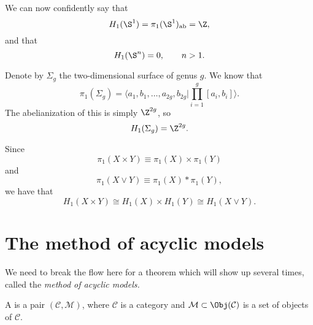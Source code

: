 \documentclass[main.tex]{subfiles}
\begin{document}
\begin{example}
  We can now confidently say that
  \begin{equation*}
    H_{1}(\S^{1}) = \pi_{1}(\S^{1})_{\mathrm{ab}} = \Z,
  \end{equation*}
  and that
  \begin{equation*}
    H_{1}(\S^{n}) = 0,\qquad n > 1.
  \end{equation*}
\end{example}

\begin{example}
  Denote by $\Sigma_{g}$ the two-dimensional surface of genus $g$. We know that
  \begin{equation*}
    \pi_{1}(\Sigma_{g}) = \langle a_{1}, b_{1}, \ldots, a_{2g}, b_{2g} | \prod_{i = 1}^{g} [a_{i}, b_{i}] \rangle.
  \end{equation*}
  The abelianization of this is simply $\Z^{2g}$, so
  \begin{equation*}
    H_{1}(\Sigma_{g}) = \Z^{2g}.
  \end{equation*}
\end{example}

\begin{example}
  Since
  \begin{equation*}
    \pi_{1}(X \times Y) \equiv \pi_{1}(X) \times \pi_{1}(Y)
  \end{equation*}
  and
  \begin{equation*}
    \pi_{1}(X \vee Y) \equiv \pi_{1}(X) * \pi_{1}(Y),
  \end{equation*}
  we have that
  \begin{equation*}
    H_{1}(X \times Y) \cong H_{1}(X) \times H_{1}(Y) \cong H_{1}(X \vee Y).
  \end{equation*}
\end{example}

\section{The method of acyclic models}
\label{sec:the_method_of_acyclic_models}

We need to break the flow here for a theorem which will show up several times, called the \emph{method of acyclic models.}

\begin{definition}
  \label{def:category_with_models}
  A  is a pair $(\mathcal{C}, \mathcal{M})$, where $\mathcal{C}$ is a category and $\mathcal{M} \subset \Obj(\mathcal{C})$ is a set of objects of $\mathcal{C}$.
\end{definition}
\end{document}
